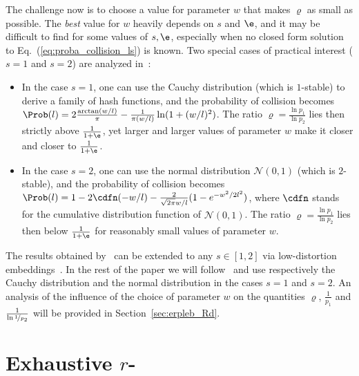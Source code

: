 The challenge now is to choose a value for parameter $w$ that makes
$\varrho$ as small as
possible. The {\em best} value for $w$ heavily depends on $s$ and
$\e$, and it may be difficult to find for some values of $s,\e$,
especially when no closed form solution to
Eq.~(\ref{eq:proba_collision_ls}) is known. Two special cases of
practical interest ($s=1$ and $s=2$) are analyzed
in~\cite{DIIM04}:
\begin{itemize}
\item In the case $s=1$, one can use the Cauchy distribution (which is
  $1$-stable) to derive a family of hash functions, and the
  probability of collision becomes $\Prob(l)=2\frac{\arctan(w/l)}{\pi} -
  \frac{1}{\pi(w/l)}\ln(1+(w/l)^2)$. The ratio $\varrho=\frac{\ln
    p_1}{\ln p_2}$ lies then strictly above $\frac{1}{1+\e}$, yet
  larger and larger values of parameter $w$ make it closer and
  closer to $\frac{1}{1+\e}$.
\item In the case $s=2$, one can use the normal distribution
  $\mathcal{N}(0,1)$ (which is $2$-stable), and the probability of
  collision becomes $\Prob(l) = 1-2\cdfn(-w/l) -
  \frac{2}{\sqrt{2\pi}w/l}(1- e^{-w^2/2l^2})$, where
  $\cdfn$ stands for the cumulative
  distribution function of $\mathcal{N}(0,1)$.  The ratio
  $\varrho=\frac{\ln p_1}{\ln p_2}$ lies then below $\frac{1}{1+\e}$
  for reasonably small values of parameter $w$.
\end{itemize}
The results obtained by~\citet{DIIM04} can be extended to any
$s\in [1,2]$ via low-distortion embeddings~\cite{js-elpilo}.  In the
rest of the paper we will follow~\cite{DIIM04} and use respectively
the Cauchy distribution and the normal distribution in the cases $s=1$
and $s=2$. An analysis of the influence of the choice of
parameter $w$ on the quantities $\varrho$, $\frac{1}{p_1}$ and
$\frac{1}{\ln\nicefrac{1}{p_2}}$ will be provided in
Section~\ref{sec:erpleb_Rd}.




\section{Exhaustive $r$-\pleb}
\label{sec:all-re-nn}

